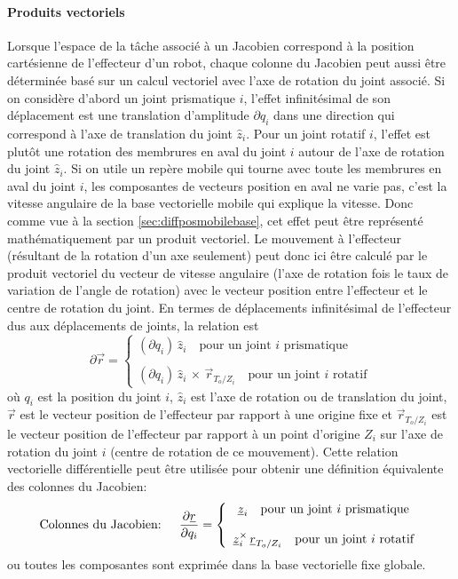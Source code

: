 \paragraph{Produits vectoriels}

Lorsque l'espace de la tâche associé à un Jacobien correspond à la position cartésienne de l'effecteur d'un robot, chaque colonne du Jacobien peut aussi être déterminée basé sur un calcul vectoriel avec l'axe de rotation du joint associé. Si on considère d'abord un joint prismatique $i$, l'effet infinitésimal de son déplacement est une translation d'amplitude $\partial q_i$ dans une direction qui correspond à l'axe de translation du joint $\hat{z}_i$. Pour un joint rotatif $i$, l'effet est plutôt une rotation des membrures en aval du joint $i$ autour de l'axe de rotation du joint $\hat{z}_i$. Si on utile un repère mobile qui tourne avec toute les membrures en aval du joint $i$, les composantes de vecteurs position en aval ne varie pas, c'est la vitesse angulaire de la base vectorielle mobile qui explique la vitesse. Donc comme vue à la section \ref{sec:diffposmobilebase}, cet effet peut être représenté mathématiquement par un produit vectoriel. Le mouvement à l'effecteur (résultant de la rotation d'un axe seulement) peut donc ici être calculé par le produit vectoriel du vecteur de vitesse angulaire (l'axe de rotation fois le taux de variation de l'angle de rotation) avec le vecteur position entre l'effecteur et le centre de rotation du joint. En termes de déplacements infinitésimal de l'effecteur dus aux déplacements de joints, la relation est
\begin{equation}
\partial \Vec{r} = \left\{ \begin{array}{c}
\left( \partial q_i \right) \, \hat{z}_i \quad \text{pour un joint $i$ prismatique}
 \\ \\
\left( \partial q_i \right) \, \hat{z}_i \, \times \, \vec{r}_{T_o/Z_i}
\quad \text{pour un joint $i$ rotatif}
\end{array}
\right.
\end{equation}
où $q_i$ est la position du joint $i$, $\hat{z}_i$ est l'axe de rotation ou de translation du joint, $\vec{r}$ est le vecteur position de l'effecteur par rapport à une origine fixe et $\vec{r}_{T_o/Z_i}$ est le vecteur position de l'effecteur par rapport à un point d'origine $Z_i$ sur l'axe de rotation du joint $i$ (centre de rotation de ce mouvement). Cette relation vectorielle différentielle peut être utilisée pour obtenir une définition équivalente des colonnes du Jacobien: 
\begin{equation}
\text{Colonnes du Jacobien: } \quad
\frac{\partial \underline{r}}{\partial q_i} = \left\{ \begin{array}{c}
\underline{z}_i \quad \text{pour un joint $i$ prismatique}
 \\ \\
\underline{z}_i^{\times} \, \underline{r}_{T_o/Z_i}
\quad \text{pour un joint $i$ rotatif}
\end{array}
\right.
\label{eq:jacocolprodvec}
\end{equation}
ou toutes les composantes sont exprimée dans la base vectorielle fixe globale.


